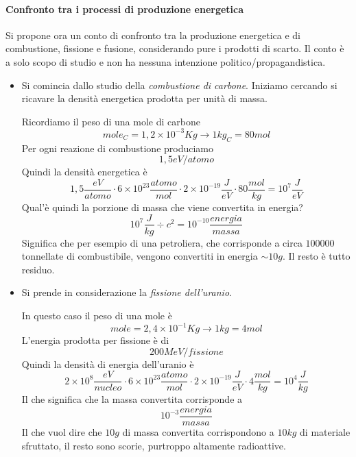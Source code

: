 \paragraph{Confronto tra i processi di produzione energetica}
Si propone ora un conto di confronto tra la produzione energetica e di combustione, fissione e fusione, considerando pure i prodotti di scarto.
Il conto è a solo scopo di studio e non ha nessuna intenzione politico/propagandistica.
\begin{itemize}
\item Si comincia dallo studio della \emph{combustione di carbone}.
Iniziamo cercando si ricavare la densità energetica prodotta per unità di massa.

Ricordiamo il peso di una mole di carbone
\begin{equation}
mole_C=1,2\times10^{-3}Kg\to 1kg_C=80 mol
\end{equation} 
Per ogni reazione di combustione produciamo
\begin{equation}
1,5eV/atomo
\end{equation}
Quindi la densità energetica è
\begin{equation}
1,5\frac{eV}{atomo}\cdot 6\times10^{23}\frac{atomo}{mol}\cdot 2\times 10^{-19}\frac{J}{eV}\cdot 80\frac{mol}{kg}=10^7\frac{J}{eV}
\end{equation}
Qual'è quindi la porzione di massa che viene convertita in energia?
\begin{equation}
10^7\frac{J}{kg}\div c^2=10^{-10}\frac{energia}{massa}
\end{equation}
Significa che per esempio di una petroliera, che corrisponde a circa $100000$ tonnellate di combustibile, vengono convertiti in energia $\sim 10g$. 
Il resto è tutto residuo.

\item Si prende in considerazione la \emph{fissione dell'uranio}.

In questo caso il peso di una mole è
\begin{equation}
mole=2,4\times10^{-1}Kg\to 1kg=4mol
\end{equation}
L'energia prodotta per fissione è di 
\begin{equation}
200MeV/fissione
\end{equation}
Quindi la densità di energia dell'uranio è
\begin{equation}
2\times 10^8\frac{eV}{nucleo}\cdot 6\times10^{23}\frac{atomo}{mol}\cdot 2\times 10^{-19}\frac{J}{eV}\cdot4\frac{mol}{kg}=10^4\frac{J}{kg}
\end{equation}
Il che significa che la massa convertita corrisponde a
\begin{equation}
10^{-3}\frac{energia}{massa}
\end{equation}
Il che vuol dire che $10g$ di massa convertita corrispondono a $10kg$ di materiale sfruttato, il resto sono scorie, purtroppo altamente radioattive.


\end{itemize}

